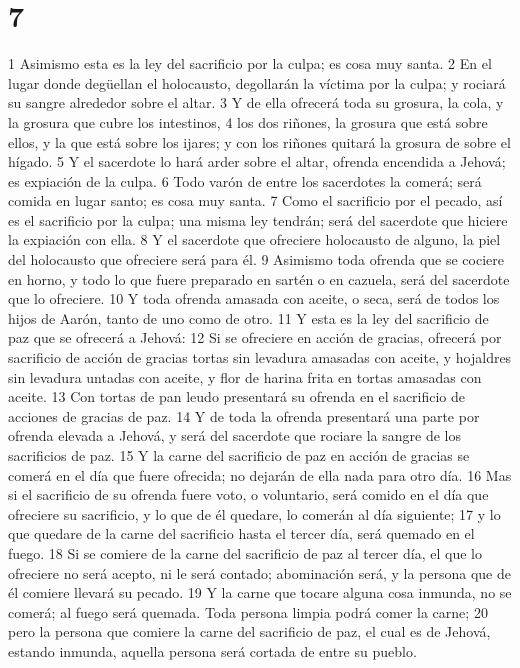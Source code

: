 \chapter{7}

1 Asimismo esta es la ley del sacrificio por la culpa; es cosa muy santa.
2 En el lugar donde degüellan el holocausto, degollarán la víctima por la culpa; y rociará su sangre alrededor sobre el altar.
3 Y de ella ofrecerá toda su grosura, la cola, y la grosura que cubre los intestinos,
4 los dos riñones, la grosura que está sobre ellos, y la que está sobre los ijares; y con los riñones quitará la grosura de sobre el hígado.
5 Y el sacerdote lo hará arder sobre el altar, ofrenda encendida a Jehová; es expiación de la culpa.
6 Todo varón de entre los sacerdotes la comerá; será comida en lugar santo; es cosa muy santa.
7 Como el sacrificio por el pecado, así es el sacrificio por la culpa; una misma ley tendrán; será del sacerdote que hiciere la expiación con ella.
8 Y el sacerdote que ofreciere holocausto de alguno, la piel del holocausto que ofreciere será para él.
9 Asimismo toda ofrenda que se cociere en horno, y todo lo que fuere preparado en sartén o en cazuela, será del sacerdote que lo ofreciere.
10 Y toda ofrenda amasada con aceite, o seca, será de todos los hijos de Aarón, tanto de uno como de otro.
11 Y esta es la ley del sacrificio de paz que se ofrecerá a Jehová:
12 Si se ofreciere en acción de gracias, ofrecerá por sacrificio de acción de gracias tortas sin levadura amasadas con aceite, y hojaldres sin levadura untadas con aceite, y flor de harina frita en tortas amasadas con aceite.
13 Con tortas de pan leudo presentará su ofrenda en el sacrificio de acciones de gracias de paz.
14 Y de toda la ofrenda presentará una parte por ofrenda elevada a Jehová, y será del sacerdote que rociare la sangre de los sacrificios de paz.
15 Y la carne del sacrificio de paz en acción de gracias se comerá en el día que fuere ofrecida; no dejarán de ella nada para otro día.
16 Mas si el sacrificio de su ofrenda fuere voto, o voluntario, será comido en el día que ofreciere su sacrificio, y lo que de él quedare, lo comerán al día siguiente;
17 y lo que quedare de la carne del sacrificio hasta el tercer día, será quemado en el fuego.
18 Si se comiere de la carne del sacrificio de paz al tercer día, el que lo ofreciere no será acepto, ni le será contado; abominación será, y la persona que de él comiere llevará su pecado.
19 Y la carne que tocare alguna cosa inmunda, no se comerá; al fuego será quemada. Toda persona limpia podrá comer la carne;
20 pero la persona que comiere la carne del sacrificio de paz, el cual es de Jehová, estando inmunda, aquella persona será cortada de entre su pueblo.
